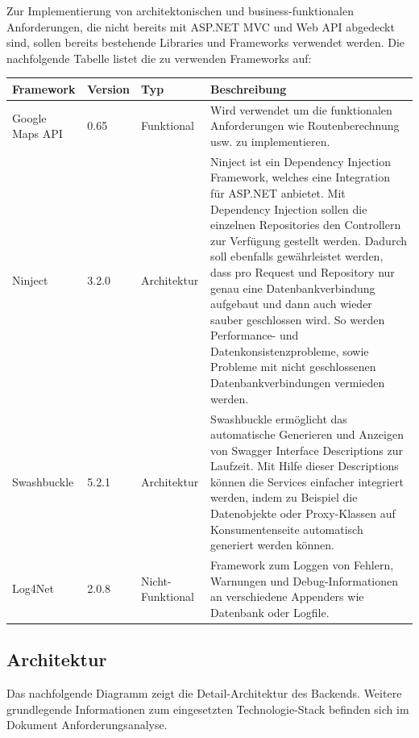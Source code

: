 \documentclass[a4paper,10pt,xetex]{article}
\begin{document}
	Zur Implementierung von architektonischen und business-funktionalen Anforderungen, die nicht bereits mit ASP.NET MVC und
	Web API abgedeckt sind, sollen bereits bestehende Libraries und Frameworks verwendet werden. Die nachfolgende Tabelle
	listet die zu verwenden Frameworks auf:


\bigskip

\begin{longtabu} to \textwidth { | l | l || l | l | }
	\hline
	\textbf{Framework} & \textbf{Version}  & \textbf{Typ} & \textbf{Beschreibung} \\
	\hline
	\endhead
	
		Google Maps API &
		0.65 &
		Funktional &
		Wird verwendet um die funktionalen Anforderungen wie Routenberechnung usw. zu
			implementieren.\\\hline
		Ninject &
		3.2.0 &
		Architektur &
		Ninject ist ein Dependency Injection Framework, welches eine Integration f\"ur ASP.NET
			anbietet. Mit Dependency Injection sollen die einzelnen Repositories den Controllern zur Verf\"ugung gestellt werden.
			Dadurch soll ebenfalls gew\"ahrleistet werden, dass pro Request und Repository nur genau eine Datenbankverbindung
			aufgebaut und dann auch wieder sauber geschlossen wird. So werden Performance- und Datenkonsistenzprobleme, sowie
			Probleme mit nicht geschlossenen Datenbankverbindungen vermieden werden.\\\hline
		Swashbuckle &
		5.2.1 &
		Architektur &
		Swashbuckle erm\"oglicht das automatische Generieren und Anzeigen von Swagger Interface
			Descriptions zur Laufzeit. Mit Hilfe dieser Descriptions k\"onnen die Services einfacher integriert werden, indem zu
			Beispiel die Datenobjekte oder Proxy-Klassen auf Konsumentenseite automatisch generiert werden k\"onnen.\\\hline
		Log4Net &
		2.0.8 &
		Nicht-Funktional &
		Framework zum Loggen von Fehlern, Warnungen und Debug-Informationen an verschiedene
			Appenders wie Datenbank oder Logfile.\\\hline
\end{longtabu}
\subsection[Architektur]{Architektur}
Das nachfolgende Diagramm zeigt die
		Detail-Architektur des Backends. Weitere grundlegende Informationen zum eingesetzten
		Technologie-Stack befinden sich im Dokument Anforderungsanalyse.
\end{document}

